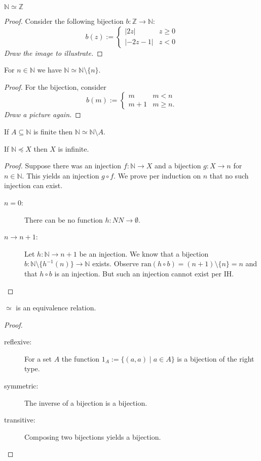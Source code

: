\documentclass{whrartcl}
\newcommand{\NN}{\mathbb{N}}
\newcommand{\ZZ}{\mathbb{Z}}
\newcommand{\ran}{\text{ran}}
\newcommand{\abs}[1]{|#1|}
\begin{document}
\begin{lemma}
  $\NN \simeq \ZZ$
\end{lemma}
\begin{proof}
  Consider the following bijection $b : \ZZ \to \NN$:
  \[
    b(z) :=
    \begin{cases}
      \abs{2z} & z \geq 0 \\
      \abs{-2z - 1} & z < 0
    \end{cases}
  \]
  \emph{Draw the image to illustrate.}
\end{proof}

\begin{lemma}
  For $n \in \NN$ we have $\NN \simeq \NN \setminus \{n\}$.
\end{lemma}
\begin{proof}
  For the bijection, consider
  \[
    b(m) :=
    \begin{cases}
      m & m < n \\
      m + 1 & m \geq n.
    \end{cases}
  \]
  \emph{Draw a picture again.}
\end{proof}

\begin{corollary}
  If $A \subseteq \NN$ is finite then $\NN \simeq \NN \setminus A$.
\end{corollary}

\begin{lemma}
  If $\NN \preceq X$ then $X$ is infinite.
\end{lemma}
\begin{proof}
  Suppose there was an injection $f : \NN \to X$ and a bijection $g : X \to n$
  for $n \in \NN$. This yields an injection $g \circ f$. We prove per induction
  on $n$ that no such injection can exist.
  \begin{description}
  \item[$n = 0$:] There can be no function $h : NN \to \emptyset$.
  \item[$n \to n + 1$:] Let $h : \NN \to n + 1$ be an injection. We know that a
    bijection $b : \NN \setminus \{h^{-1}(n)\} \to \NN$ exists. Observe $\ran(h
    \circ b) = (n + 1) \setminus \{n\} = n$ and that $h \circ b$ is an
    injection. But such an injection cannot exist per IH.
  \end{description}
\end{proof}

\begin{lemma}
  $\simeq$ is an equivalence relation.
\end{lemma}
\begin{proof}
  \
  \begin{description}
  \item[reflexive:] For a set $A$ the function $1_A := \{(a, a) \mid a \in A\}$
    is a bijection of the right type.
  \item[symmetric:] The inverse of a bijection is a bijection.
  \item[transitive:] Composing two bijections yields a bijection.
  \end{description}
\end{proof}
\end{document}
